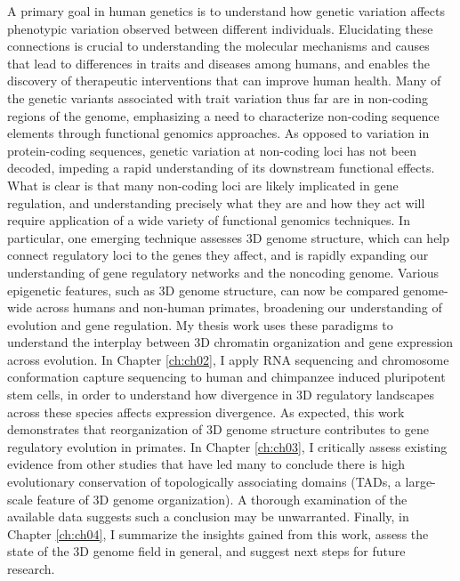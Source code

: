 \abstract
A primary goal in human genetics is to understand how genetic variation affects phenotypic variation observed between different individuals.  Elucidating these connections is crucial to understanding the molecular mechanisms and causes that lead to differences in traits and diseases among humans, and enables the discovery of therapeutic interventions that can improve human health. Many of the genetic variants associated with trait variation thus far are in non-coding regions of the genome, emphasizing a need to characterize non-coding sequence elements through functional genomics approaches. As opposed to variation in protein-coding sequences, genetic variation at non-coding loci has not been decoded, impeding a rapid understanding of its downstream functional effects. What is clear is that many non-coding loci are likely implicated in gene regulation, and understanding precisely what they are and how they act will require application of a wide variety of functional genomics techniques. In particular, one emerging technique assesses 3D genome structure, which can help connect regulatory loci to the genes they affect, and is rapidly expanding our understanding of gene regulatory networks and the noncoding genome. Various epigenetic features, such as 3D genome structure, can now be compared genome-wide across humans and non-human primates, broadening our understanding of evolution and gene regulation. My thesis work uses these paradigms to understand the interplay between 3D chromatin organization and gene expression across evolution. In Chapter \ref{ch:ch02}, I apply RNA sequencing and chromosome conformation capture sequencing to human and chimpanzee induced pluripotent stem cells, in order to understand how divergence in 3D regulatory landscapes across these species affects expression divergence. As expected, this work demonstrates that reorganization of 3D genome structure contributes to gene regulatory evolution in primates. In Chapter \ref{ch:ch03}, I critically assess existing evidence from other studies that have led many to conclude there is high evolutionary conservation of topologically associating domains (TADs, a large-scale feature of 3D genome organization). A thorough examination of the available data suggests such a conclusion may be unwarranted. Finally, in Chapter \ref{ch:ch04}, I summarize the insights gained from this work, assess the state of the 3D genome field in general, and suggest next steps for future research.